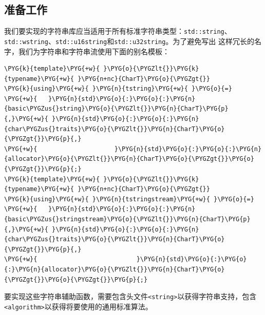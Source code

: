 
\subsection{准备工作}



我们要实现的字符串库应当适用于所有标准字符串类型：\texttt{std::\allowbreak{}string}、\texttt{std::\allowbreak{}wstring}、\texttt{std::\allowbreak{}u16string}和\texttt{std::\allowbreak{}u32string}。为了避免写出 这样冗长的名字，我们为字符串和字符串流使用下面的别名模板：



\begin{codeblockbg}
\begin{Verbatim}[commandchars=\\\{\},breaklines=true,breakanywhere=true,fontsize=\codefont,xleftmargin=17bp]
\PYG{k}{template}\PYG{+w}{ }\PYG{o}{\PYGZlt{}}\PYG{k}{typename}\PYG{+w}{ }\PYG{n+nc}{CharT}\PYG{o}{\PYGZgt{}}
\PYG{k}{using}\PYG{+w}{ }\PYG{n}{tstring}\PYG{+w}{ }\PYG{o}{=}
\PYG{+w}{   }\PYG{n}{std}\PYG{o}{:}\PYG{o}{:}\PYG{n}{basic\PYGZus{}string}\PYG{o}{\PYGZlt{}}\PYG{n}{CharT}\PYG{p}{,}\PYG{+w}{ }\PYG{n}{std}\PYG{o}{:}\PYG{o}{:}\PYG{n}{char\PYGZus{}traits}\PYG{o}{\PYGZlt{}}\PYG{n}{CharT}\PYG{o}{\PYGZgt{}}\PYG{p}{,}
\PYG{+w}{                     }\PYG{n}{std}\PYG{o}{:}\PYG{o}{:}\PYG{n}{allocator}\PYG{o}{\PYGZlt{}}\PYG{n}{CharT}\PYG{o}{\PYGZgt{}}\PYG{o}{\PYGZgt{}}\PYG{p}{;}
\PYG{k}{template}\PYG{+w}{ }\PYG{o}{\PYGZlt{}}\PYG{k}{typename}\PYG{+w}{ }\PYG{n+nc}{CharT}\PYG{o}{\PYGZgt{}}
\PYG{k}{using}\PYG{+w}{ }\PYG{n}{tstringstream}\PYG{+w}{ }\PYG{o}{=}
\PYG{+w}{   }\PYG{n}{std}\PYG{o}{:}\PYG{o}{:}\PYG{n}{basic\PYGZus{}stringstream}\PYG{o}{\PYGZlt{}}\PYG{n}{CharT}\PYG{p}{,}\PYG{+w}{ }\PYG{n}{std}\PYG{o}{:}\PYG{o}{:}\PYG{n}{char\PYGZus{}traits}\PYG{o}{\PYGZlt{}}\PYG{n}{CharT}\PYG{o}{\PYGZgt{}}\PYG{p}{,}
\PYG{+w}{                           }\PYG{n}{std}\PYG{o}{:}\PYG{o}{:}\PYG{n}{allocator}\PYG{o}{\PYGZlt{}}\PYG{n}{CharT}\PYG{o}{\PYGZgt{}}\PYG{o}{\PYGZgt{}}\PYG{p}{;}
\end{Verbatim}
\end{codeblockbg}



要实现这些字符串辅助函数，需要包含头文件\texttt{<\allowbreak{}string>}以获得字符串支持，包含\texttt{<\allowbreak{}algorithm>}以获得将要使用的通用标准算法。


